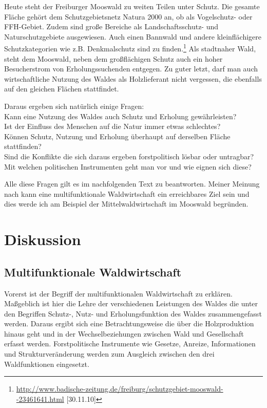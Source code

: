 \documentclass[12pt]{article}
\newcommand{\citefooturldate}[2]{\footnote{\url{#1} [#2]}}
\begin{document}
Heute steht der Freiburger Mooswald zu weiten Teilen unter Schutz. Die gesamte Fläche gehört dem
Schutzgebietsnetz Natura 2000 an, ob als Vogelschutz- oder FFH-Gebiet. Zudem sind große Bereiche
als Landschaftsschutz- und Naturschutzgebiete ausgewiesen. Auch einen Bannwald und andere kleinflächigere
Schutzkategorien wie z.B. Denkmalschutz sind zu finden.\citefooturldate{http://www.badische-zeitung.de/freiburg/schutzgebiet-mooswald--23461641.html}{30.11.10} 
Als stadtnaher Wald, steht dem Mooswald, neben dem
großflächigen Schutz auch ein hoher Besucherstrom von Erholungssuchenden entgegen. Zu guter letzt, darf man
auch wirtschaftliche Nutzung des Waldes als Holzlieferant nicht vergessen, die ebenfalls auf den gleichen
Flächen stattfindet.

Daraus ergeben sich natürlich einige Fragen:\\ 
Kann eine Nutzung des Waldes auch Schutz und Erholung gewährleisten? \\
Ist der Einfluss des Menschen auf die Natur immer etwas schlechtes? \\
Können Schutz, Nutzung und Erholung überhaupt auf derselben Fläche stattfinden? \\
Sind die Konflikte die sich daraus ergeben forstpolitisch lösbar oder untragbar? \\
Mit welchen politischen Instrumenten geht man vor und wie eignen sich diese?

Alle diese Fragen gilt es im nachfolgenden Text zu beantworten. 
Meiner Meinung nach kann eine multifunktionale Waldwirtschaft ein erreichbares Ziel sein
und dies werde ich am Beispiel der Mittelwaldwirtschaft im Mooswald begründen. 


\section*{Diskussion}
\subsection*{Multifunktionale Waldwirtschaft}
Vorerst ist der Begriff der multifunktionalen Waldwirtschaft zu erklären. Maßgeblich ist
hier die Lehre der verschiedenen Leistungen des Waldes die unter den Begriffen Schutz-, Nutz-
und Erholungsfunktion des Waldes zusammengefasst werden. Daraus ergibt sich eine Betrachtungsweise
die über die Holzproduktion hinaus geht und in der Wechselbeziehungen zwischen Wald und Gesellschaft
erfasst werden. Forstpolitische Instrumente wie Gesetze, Anreize, Informationen und Strukturveränderung
werden zum Ausgleich zwischen den drei Waldfunktionen eingesetzt. 
\end{document}
